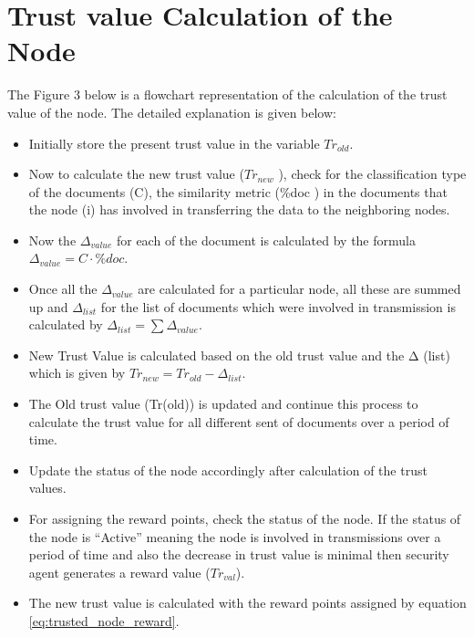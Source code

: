  \section{Trust value Calculation of the Node}
The Figure 3 below is a flowchart representation of the calculation of the trust value of the node. The detailed explanation is given below:
\begin{itemize}
    \item Initially store the present trust value in the variable \( Tr_{old} \).
    \item Now to calculate the new trust value (\( Tr_{new} \) ), check for the
    classification type of the documents (C), the similarity metric (\%doc ) in
    the documents that the node (i) has involved in transferring the data to the
    neighboring nodes.  
    \item Now the \( \Delta_{value} \) for each of the document is calculated
    by the formula  \( \Delta_{value} = C \cdot \% doc \).
    \item Once all the \( \Delta_{value} \) are calculated for a particular node, all these are
    summed up and      \( \Delta_{list} \) for the list of documents which were involved in
    transmission is calculated by \( \Delta_{list} = \sum \Delta_{value} \).  
    \item New Trust Value is calculated based on the old trust value and the Δ (list)
        which is given by \( Tr_{new} = Tr_{old} - \Delta_{list} \).
    \item The Old trust value (Tr(old)) is updated and continue this process to
    calculate the trust value for all different sent of documents over a period
    of time.  
    \item Update the status of the node accordingly after calculation of the
    trust values.
    \item For assigning the reward points, check the status of the node. If the status
    of the node is “Active” meaning the node is involved in transmissions over
    a period of time and also the decrease in trust value is minimal then
    security agent generates a reward value      (\( Tr_{val} \)).  
    \item The new trust value is calculated with the reward points assigned by
        equation \ref{eq:trusted_node_reward}.
\end{itemize}
